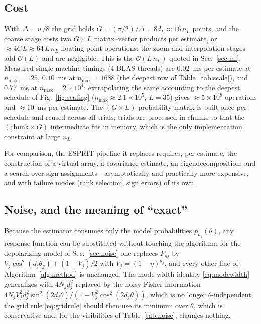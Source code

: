 \documentclass[%
 twocolumn,
 amsmath,amssymb,
prx,
longbibliography
]{revtex4-2}
\begin{document}
\subsection{Cost}\label{app:cost}

With $\Delta = w/8$ the grid holds $G = (\pi/2)/\Delta = 8 d_L \approx 16\, n_L$ points, and the coarse stage costs two $G \times L$ matrix--vector products per estimate, or $\approx 4 G L \approx 64\, L\, n_L$ floating-point operations; the zoom and interpolation stages add $\mathcal{O}(L)$ and are negligible. This is the $\mathcal{O}(L\, n_L)$ quoted in Sec.~\ref{sec:ml}. Measured single-machine timings (4 BLAS threads) are $0.02$~ms per estimate at $n_{\max} = 125$, $0.10$~ms at $n_{\max} = 1688$ (the deepest row of Table~\ref{tab:scale}), and $0.77$~ms at $n_{\max} = 2\times10^4$; extrapolating the same accounting to the deepest schedule of Fig.~\ref{fig:scaling} ($n_{\max} \approx 2.1\times10^5$, $L = 35$) gives $\approx 5\times10^8$ operations and $\approx 10$~ms per estimate. The $(G \times L)$ probability matrix is built once per schedule and reused across all trials; trials are processed in chunks so that the $(\text{chunk} \times G)$ intermediate fits in memory, which is the only implementation constraint at large $n_L$.

For comparison, the ESPRIT pipeline it replaces requires, per estimate, the construction of a virtual array, a covariance estimate, an eigendecomposition, and a search over sign assignments---asymptotically and practically more expensive, and with failure modes (rank selection, sign errors) of its own.

\subsection{Noise, and the meaning of ``exact''}\label{app:caveats}

Because the estimator consumes only the model probabilities $p_{n_j}(\theta)$, any response function can be substituted without touching the algorithm: for the depolarizing model of Sec.~\ref{sec:noise} one replaces $P_{gj}$ by $V_j \cos^2(d_j\theta_g) + (1 - V_j)/2$ with $V_j = (1-\eta)^{d_j}$, and every other line of Algorithm~\ref{alg:method} is unchanged. The mode-width identity \eqref{eq:modewidth} generalizes with $4N_jd_j^2$ replaced by the noisy Fisher information $4N_jV_j^2 d_j^2\sin^2(2d_j\theta)/(1 - V_j^2\cos^2(2d_j\theta))$, which is no longer $\theta$-independent; the grid rule \eqref{eq:gridrule} should then use its minimum over $\theta$, which is conservative and, for the visibilities of Table~\ref{tab:noise}, changes nothing.
\end{document}
